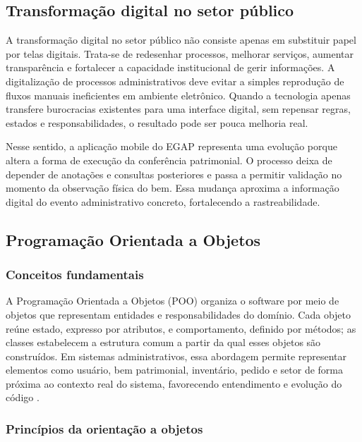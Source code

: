 \documentclass[12pt,a4paper]{article}
\begin{document}
\subsection{Transformação digital no setor público}

A transformação digital no setor público não consiste apenas em substituir papel por telas digitais. Trata-se de redesenhar processos, melhorar serviços, aumentar transparência e fortalecer a capacidade institucional de gerir informações. A digitalização de processos administrativos deve evitar a simples reprodução de fluxos manuais ineficientes em ambiente eletrônico. Quando a tecnologia apenas transfere burocracias existentes para uma interface digital, sem repensar regras, estados e responsabilidades, o resultado pode ser pouca melhoria real.

Nesse sentido, a aplicação mobile do EGAP representa uma evolução porque altera a forma de execução da conferência patrimonial. O processo deixa de depender de anotações e consultas posteriores e passa a permitir validação no momento da observação física do bem. Essa mudança aproxima a informação digital do evento administrativo concreto, fortalecendo a rastreabilidade.

\subsection{Programação Orientada a Objetos}

\subsubsection{Conceitos fundamentais}

A Programação Orientada a Objetos (POO) organiza o software por meio de objetos que representam entidades e responsabilidades do domínio. Cada objeto reúne estado, expresso por atributos, e comportamento, definido por métodos; as classes estabelecem a estrutura comum a partir da qual esses objetos são construídos. Em sistemas administrativos, essa abordagem permite representar elementos como usuário, bem patrimonial, inventário, pedido e setor de forma próxima ao contexto real do sistema, favorecendo entendimento e evolução do código \cite{pressman,sommerville}.

\subsubsection{Princípios da orientação a objetos}
\end{document}
